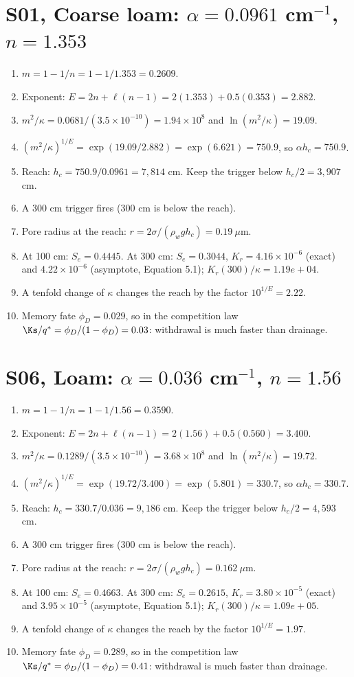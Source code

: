 \section{S01, Coarse loam: $\alpha=0.0961$ cm$^{-1}$, $n=1.353$}
\begin{enumerate}[leftmargin=*,itemsep=1pt]
\item $m=1-1/n=1-1/1.353=0.2609$.
\item Exponent: $E=2n+\ell(n-1)=2(1.353)+0.5(0.353)=2.882$.
\item $m^2/\kappa=0.0681/(3.5\times10^{-10})=1.94\times10^{8}$ and $\ln(m^2/\kappa)=19.09$.
\item $(m^2/\kappa)^{1/E}=\exp(19.09/2.882)=\exp(6.621)=750.9$, so $\alpha h_c=750.9$.
\item Reach: $h_c=750.9/0.0961=7,814$ cm. Keep the trigger below $h_c/2=3,907$ cm.
\item A 300 cm trigger fires (300 cm is below the reach).
\item Pore radius at the reach: $r=2\sigma/(\rho_wgh_c)=0.19\ \mu$m.
\item At 100 cm: $S_e=0.4445$. At 300 cm: $S_e=0.3044$, $K_r=4.16\times10^{-6}$ (exact) and $4.22\times10^{-6}$ (asymptote, Equation 5.1); $K_r(300)/\kappa=1.19e+04$.
\item A tenfold change of $\kappa$ changes the reach by the factor $10^{1/E}=2.22$.
\item Memory fate $\phi_D=0.029$, so in the competition law $\Ks/q^*=\phi_D/(1-\phi_D)=0.03$: withdrawal is much faster than drainage.
\end{enumerate}
\section{S06, Loam: $\alpha=0.036$ cm$^{-1}$, $n=1.56$}
\begin{enumerate}[leftmargin=*,itemsep=1pt]
\item $m=1-1/n=1-1/1.56=0.3590$.
\item Exponent: $E=2n+\ell(n-1)=2(1.56)+0.5(0.560)=3.400$.
\item $m^2/\kappa=0.1289/(3.5\times10^{-10})=3.68\times10^{8}$ and $\ln(m^2/\kappa)=19.72$.
\item $(m^2/\kappa)^{1/E}=\exp(19.72/3.400)=\exp(5.801)=330.7$, so $\alpha h_c=330.7$.
\item Reach: $h_c=330.7/0.036=9,186$ cm. Keep the trigger below $h_c/2=4,593$ cm.
\item A 300 cm trigger fires (300 cm is below the reach).
\item Pore radius at the reach: $r=2\sigma/(\rho_wgh_c)=0.162\ \mu$m.
\item At 100 cm: $S_e=0.4663$. At 300 cm: $S_e=0.2615$, $K_r=3.80\times10^{-5}$ (exact) and $3.95\times10^{-5}$ (asymptote, Equation 5.1); $K_r(300)/\kappa=1.09e+05$.
\item A tenfold change of $\kappa$ changes the reach by the factor $10^{1/E}=1.97$.
\item Memory fate $\phi_D=0.289$, so in the competition law $\Ks/q^*=\phi_D/(1-\phi_D)=0.41$: withdrawal is much faster than drainage.
\end{enumerate}
